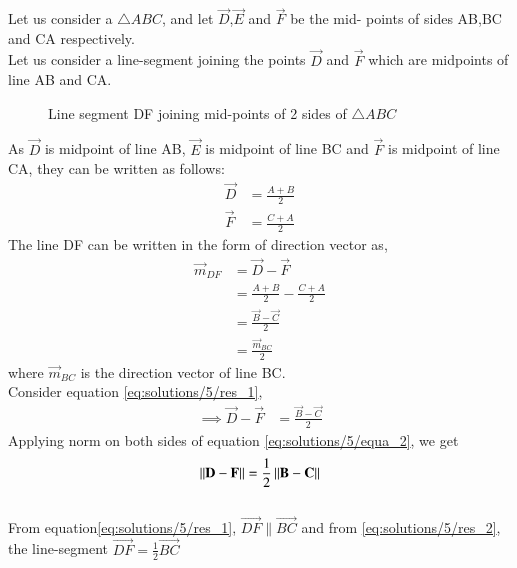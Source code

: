 Let us consider a $\triangle{ABC}$, and let $\vec{D}$,$\vec{E}$ and $\vec{F}$ be the mid- points of sides AB,BC and CA respectively.\\
Let us consider a line-segment joining the points $\vec{D}$ and $\vec{F}$ which are midpoints of line AB and CA.\\

\begin{figure}[!ht]
\centering
\resizebox{\columnwidth}{!}{}
\caption{Line segment DF joining mid-points of 2 sides of $\triangle{ABC}$}
\label{fig:solutions/5/tri_right_angle}
\end{figure}

As $\vec{D}$ is midpoint of line AB, $\vec{E}$ is midpoint of line BC and $\vec{F}$ is midpoint of line CA, they can be written as follows:
\begin{align}
    \vec{D}&=\frac{A+B}{2} \label{eq:solutions/5/mid_1}\\
    \vec{F}&=\frac{C+A}{2} \label{eq:solutions/5/mid_3}
\end{align}
The line DF can be written in the form of direction vector as,
\begin{equation} 
\label{eq:solutions/5/res_1}
\begin{split}
\vec{m}_{DF}&=\vec{D}-\vec{F} \\
 &=\frac{A+B}{2}-\frac{C+A}{2}\\
 &=\frac{\vec{B}-\vec{C}}{2} \\
 &=\frac{\vec{m}_{BC}}{2}
\end{split}
\end{equation}
where $\vec{m}_{BC}$ is the direction vector of line BC.\\
Consider equation \eqref{eq:solutions/5/res_1},
\begin{align}
    \implies \vec{D}-\vec{F}&=\frac{\vec{B}-\vec{C}}{2}\label{eq:solutions/5/equa_2}
\end{align}
Applying norm on both sides of equation \eqref{eq:solutions/5/equa_2}, we get
\begin{align}
    \left\lVert\mathbf{D}-\mathbf{F}\right\rVert = \frac{1}{2}\left\lVert\mathbf{B}-\mathbf{C}\right\rVert\label{eq:solutions/5/res_2}
\end{align}\\
From equation\eqref{eq:solutions/5/res_1}, $\vec{DF}\parallel\vec{BC}$ and from \eqref{eq:solutions/5/res_2}, the line-segment $\vec{DF}=\frac{1}{2}\vec{BC}$


